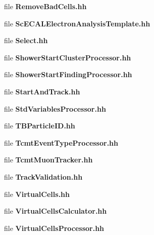 \begin{DoxyCompactItemize}
\item 
file {\bfseries Remove\-Bad\-Cells.\-hh}
\item 
file {\bfseries Sc\-E\-C\-A\-L\-Electron\-Analysis\-Template.\-hh}
\item 
file {\bfseries Select.\-hh}
\item 
file {\bfseries Shower\-Start\-Cluster\-Processor.\-hh}
\item 
file {\bfseries Shower\-Start\-Finding\-Processor.\-hh}
\item 
file {\bfseries Start\-And\-Track.\-hh}
\item 
file {\bfseries Std\-Variables\-Processor.\-hh}
\item 
file {\bfseries T\-B\-Particle\-I\-D.\-hh}
\item 
file {\bfseries Tcmt\-Event\-Type\-Processor.\-hh}
\item 
file {\bfseries Tcmt\-Muon\-Tracker.\-hh}
\item 
file {\bfseries Track\-Validation.\-hh}
\item 
file {\bfseries Virtual\-Cells.\-hh}
\item 
file {\bfseries Virtual\-Cells\-Calculator.\-hh}
\item 
file {\bfseries Virtual\-Cells\-Processor.\-hh}
\end{DoxyCompactItemize}
